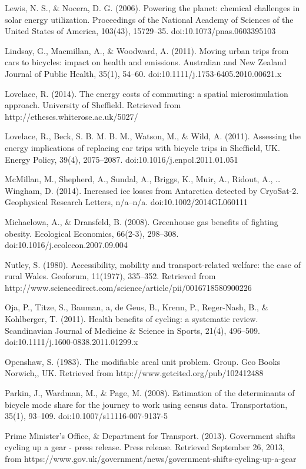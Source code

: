 Lewis, N. S., \& Nocera, D. G. (2006). Powering the planet: chemical
challenges in solar energy utilization. Proceedings of the National
Academy of Sciences of the United States of America, 103(43), 15729--35.
doi:10.1073/pnas.0603395103

Lindsay, G., Macmillan, A., \& Woodward, A. (2011). Moving urban trips
from cars to bicycles: impact on health and emissions. Australian and
New Zealand Journal of Public Health, 35(1), 54--60.
doi:10.1111/j.1753-6405.2010.00621.x

Lovelace, R. (2014). The energy costs of commuting: a spatial
microsimulation approach. University of Sheffield. Retrieved from
http://etheses.whiterose.ac.uk/5027/

Lovelace, R., Beck, S. B. M. B. M., Watson, M., \& Wild, A. (2011).
Assessing the energy implications of replacing car trips with bicycle
trips in Sheffield, UK. Energy Policy, 39(4), 2075--2087.
doi:10.1016/j.enpol.2011.01.051

McMillan, M., Shepherd, A., Sundal, A., Briggs, K., Muir, A., Ridout,
A., \ldots{} Wingham, D. (2014). Increased ice losses from Antarctica
detected by CryoSat-2. Geophysical Research Letters, n/a--n/a.
doi:10.1002/2014GL060111

Michaelowa, A., \& Dransfeld, B. (2008). Greenhouse gas benefits of
fighting obesity. Ecological Economics, 66(2-3), 298--308.
doi:10.1016/j.ecolecon.2007.09.004

Nutley, S. (1980). Accessibility, mobility and transport-related
welfare: the case of rural Wales. Geoforum, 11(1977), 335--352.
Retrieved from
http://www.sciencedirect.com/science/article/pii/0016718580900226

Oja, P., Titze, S., Bauman, a, de Geus, B., Krenn, P., Reger-Nash, B.,
\& Kohlberger, T. (2011). Health benefits of cycling: a systematic
review. Scandinavian Journal of Medicine \& Science in Sports, 21(4),
496--509. doi:10.1111/j.1600-0838.2011.01299.x

Openshaw, S. (1983). The modifiable areal unit problem. Group. Geo Books
Norwich,, UK. Retrieved from http://www.getcited.org/pub/102412488

Parkin, J., Wardman, M., \& Page, M. (2008). Estimation of the
determinants of bicycle mode share for the journey to work using census
data. Transportation, 35(1), 93--109. doi:10.1007/s11116-007-9137-5

Prime Minister's Office, \& Department for Transport. (2013). Government
shifts cycling up a gear - press release. Press release. Retrieved
September 26, 2013, from
https://www.gov.uk/government/news/government-shifts-cycling-up-a-gear


